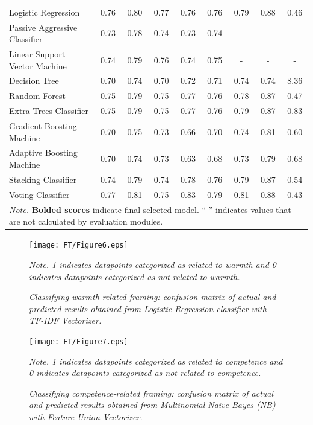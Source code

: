\documentclass[Royal,sageapa,times]{sagej}
\begin{document}
\begin{landscape}
\begin{longtable}[l]{lcccccccc}
    Logistic Regression & 0.76 & 0.80 & 0.77 & 0.76 & 0.76 & 0.79 & 0.88 & 0.46 \\
    Passive Aggressive Classifier & 0.73 & 0.78 & 0.74 & 0.73 & 0.74 & - & - & - \\
    Linear Support Vector Machine & 0.74 & 0.79 & 0.76 & 0.74 & 0.75 & - & - & - \\
    Decision Tree & 0.70 & 0.74 & 0.70 & 0.72 & 0.71 & 0.74 & 0.74 & 8.36 \\
    Random Forest & 0.75 & 0.79 & 0.75 & 0.77 & 0.76 & 0.78 & 0.87 & 0.47 \\
    Extra Trees Classifier & 0.75 & 0.79 & 0.75 & 0.77 & 0.76 & 0.79 & 0.87 & 0.83 \\
    Gradient Boosting Machine & 0.70 & 0.75 & 0.73 & 0.66 & 0.70 & 0.74 & 0.81 & 0.60 \\
    Adaptive Boosting Machine & 0.70 & 0.74 & 0.73 & 0.63 & 0.68 & 0.73 & 0.79 & 0.68 \\
    Stacking Classifier & 0.74 & 0.79 & 0.74 & 0.78 & 0.76 & 0.79 & 0.87 & 0.54 \\
    Voting Classifier & 0.77 & 0.81 & 0.75 & 0.83 & 0.79 & 0.81 & 0.88 & 0.43 \\ \hline
    \multicolumn{9}{l}{\textit{Note.} \textbf{Bolded scores} indicate final selected model. “-” indicates values that are not calculated by evaluation modules.}
    \end{longtable}
    \end{landscape}

\begin{figure}[ht]
    \setlength{\fboxsep}{0pt}%
    \setlength{\fboxrule}{0pt}%
    \begin{center}
    \texttt{[image: FT/Figure6.eps]}
    \begin{minipage}{\textwidth}
    \footnotesize
    \emph{\textit{Note.} 1 indicates datapoints categorized as related to warmth and 0 indicates datapoints categorized as not related to warmth.}
    \end{minipage}
    \end{center}
    \caption{\textit{Classifying warmth-related framing: confusion matrix of actual and predicted results obtained from Logistic Regression classifier with TF-IDF Vectorizer.}}
    \label{figure6}
    \end{figure}

\begin{figure}[ht]
    \setlength{\fboxsep}{0pt}%
    \setlength{\fboxrule}{0pt}%
    \begin{center}
    \texttt{[image: FT/Figure7.eps]}
    \begin{minipage}{\textwidth}
    \footnotesize
    \emph{\textit{Note.} 1 indicates datapoints categorized as related to competence and 0 indicates datapoints categorized as not related to competence.}
    \end{minipage}
    \end{center}
    \caption{\textit{Classifying competence-related framing: confusion matrix of actual and predicted results obtained from Multinomial Naive Bayes (NB) with Feature Union Vectorizer.}}
    \label{figure7}
    \end{figure}
\end{document}

